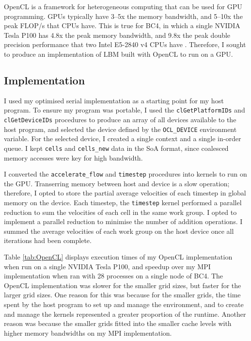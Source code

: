 \documentclass[twocolumn, a4paper]{article}
\begin{document}
OpenCL is a framework for heterogeneous computing that can be used for GPU programming.
GPUs typically have 3--5x the memory bandwidth, and 5--10x the peak FLOP/s that CPUs have.
This is true for BC4, in which a single NVIDIA Tesla P100 has 4.8x the peak memory bandwidth, and 9.8x the peak double precision performance that two Intel E5-2840 v4 CPUs have \cite{youtube}.
Therefore, I sought to produce an implementation of LBM built with OpenCL to run on a GPU.

\subsection{Implementation}

I used my optimised serial implementation as a starting point for my host program.
To ensure my program was portable, I used the \texttt{clGetPlatformIDs} and \texttt{clGetDeviceIDs} procedures to produce an array of all devices available to the host program, and selected the device defined by the \texttt{OCL\_DEVICE} environment variable.
For the selected device, I created a single context and a single in-order queue.
I kept \texttt{cells} and \texttt{cells\_new} data in the SoA format, since coalesced memory accesses were key for high bandwidth.

I converted the \texttt{accelerate\_flow} and \texttt{timestep} procedures into kernels to run on the GPU.
Transerring memory between host and device is a slow operation; therefore, I opted to store the partial average velocities of each timestep in global memory on the device.
Each timestep, the \texttt{timestep} kernel performed a parallel reduction to sum the velocities of each cell in the same work group.
I opted to implement a parallel reduction to minimise the number of addition operations.
I summed the average velocities of each work group on the host device once all iterations had been complete.

Table \ref{tab:OpenCL} displays execution times of my OpenCL implementation when run on a single NVIDIA Tesla P100, and speedup over my MPI implementation when ran with 28 processes on a single node of BC4.
The OpenCL implementation was slower for the smaller grid sizes, but faster for the larger grid sizes.
One reason for this was because for the smaller grids, the time spent by the host program to set up and manage the environment, and to create and manage the kernels represented a greater proportion of the runtime.
Another reason was because the smaller grids fitted into the smaller cache levels with higher memory bandwidths on my MPI implementation.
\end{document}
